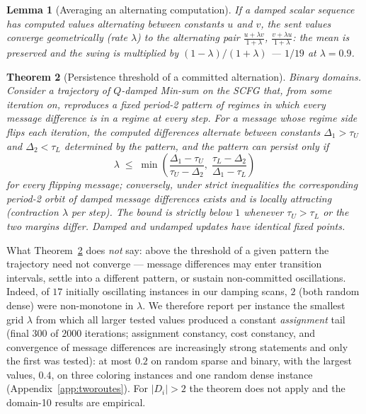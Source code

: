 \documentclass[letterpaper]{article} %
\newtheorem{theorem}{Theorem}[section]
\newtheorem{lemma}[theorem]{Lemma}
\theoremstyle{definition}
\theoremstyle{remark}
\begin{document}
\begin{lemma}[Averaging an alternating computation]\label{lem:ema}
If a damped scalar sequence has computed values alternating between
constants $u$ and $v$, the sent values converge geometrically (rate
$\lambda$) to the alternating pair $\frac{u+\lambda v}{1+\lambda}$,
$\frac{v+\lambda u}{1+\lambda}$: the mean is preserved and the swing is
multiplied by $(1-\lambda)/(1+\lambda)$ --- $1/19$ at $\lambda = 0.9$.
\end{lemma}

\begin{theorem}[Persistence threshold of a committed alternation]\label{thm:lambdastar}
Binary domains.  Consider a trajectory of $Q$-damped Min-sum on the SCFG
that, from some iteration on, reproduces a fixed period-2 pattern of
regimes in which every message difference is in a regime at every step.
For a message whose regime side flips each iteration, the computed
differences alternate between constants $\Delta_1 > \tau_U$ and
$\Delta_2 < \tau_L$ determined by the pattern, and the pattern can
persist only if
\[
  \lambda \;\le\;
  \min\!\left(
    \frac{\Delta_1 - \tau_U}{\tau_U - \Delta_2},\;
    \frac{\tau_L - \Delta_2}{\Delta_1 - \tau_L}
  \right)
\]
for every flipping message; conversely, under strict inequalities the
corresponding period-2 orbit of damped message differences exists and is
locally attracting (contraction $\lambda$ per step).  The bound is
strictly below $1$ whenever $\tau_U > \tau_L$ or the two margins differ.
Damped and undamped updates have identical fixed points.
\end{theorem}

What Theorem~\ref{thm:lambdastar} does \emph{not} say: above the
threshold of a given pattern the trajectory need not converge ---
message differences may enter transition intervals, settle into a
different pattern, or sustain non-committed oscillations.  Indeed, of
$17$ initially oscillating instances in our damping scans, $2$ (both
random dense) were non-monotone in $\lambda$.  We therefore report per
instance the smallest grid $\lambda$ from which all larger tested values
produced a constant \emph{assignment} tail (final $300$ of $2000$
iterations; assignment constancy, cost constancy, and convergence of
message differences are increasingly strong statements and only the
first was tested): at most $0.2$ on random sparse and binary, with the
largest values, $0.4$, on three coloring instances and one random dense
instance (Appendix~\ref{app:tworoutes}).  For $|D_i| > 2$ the theorem
does not apply and the domain-10 results are empirical.
\end{document}
